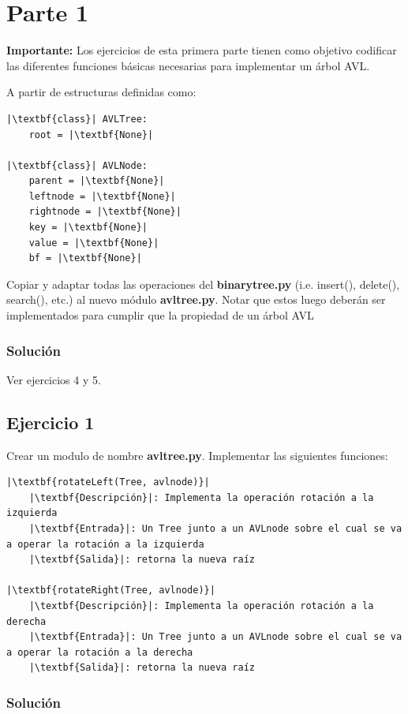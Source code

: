 \documentclass{article}
\begin{document}

\section*{Parte 1}

\textbf{Importante:} Los ejercicios de esta primera parte tienen como objetivo codificar las diferentes funciones básicas necesarias para implementar un árbol AVL.

A partir de estructuras definidas como:

\begin{lstlisting}
|\textbf{class}| AVLTree:
    root = |\textbf{None}|

|\textbf{class}| AVLNode:
    parent = |\textbf{None}|
    leftnode = |\textbf{None}|
    rightnode = |\textbf{None}|
    key = |\textbf{None}|
    value = |\textbf{None}|
    bf = |\textbf{None}|
\end{lstlisting}

Copiar y adaptar todas las operaciones del \textbf{binarytree.py} (i.e. insert(), delete(), search(), etc.) al nuevo módulo \textbf{avltree.py}. Notar que estos luego deberán ser implementados para cumplir que la propiedad de un árbol AVL
\subsubsection*{Solución}
Ver ejercicios 4 y 5.


\subsection*{Ejercicio 1}
Crear un modulo de nombre \textbf{avltree.py}. Implementar las siguientes funciones:
\begin{lstlisting}
|\textbf{rotateLeft(Tree, avlnode)}|
    |\textbf{Descripción}|: Implementa la operación rotación a la izquierda
    |\textbf{Entrada}|: Un Tree junto a un AVLnode sobre el cual se va a operar la rotación a la izquierda
    |\textbf{Salida}|: retorna la nueva raíz

|\textbf{rotateRight(Tree, avlnode)}|
    |\textbf{Descripción}|: Implementa la operación rotación a la derecha
    |\textbf{Entrada}|: Un Tree junto a un AVLnode sobre el cual se va a operar la rotación a la derecha
    |\textbf{Salida}|: retorna la nueva raíz
\end{lstlisting}
\pagebreak
\subsubsection*{Solución}
\end{document}
